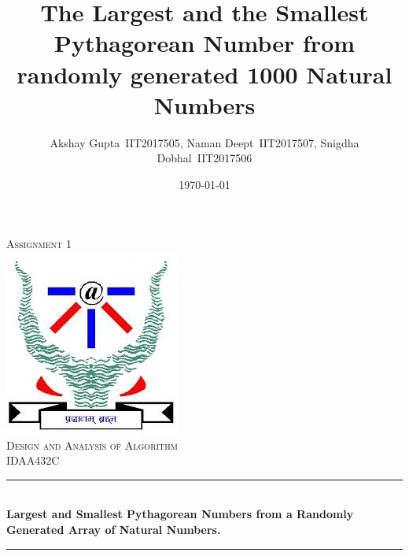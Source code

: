 \documentclass[twocolumn]{article}      %
\title{The Largest and the Smallest Pythagorean Number from randomly generated 1000 Natural Numbers}  %
\author{Akshay Gupta~{IIT2017505}, \hspace{6pt}Naman Deept~{IIT2017507},  \hspace{6pt}Snigdha Dobhal~{IIT2017506}
 }
\date{\today}      %
\begin{document}
\begin{titlepage}

\newcommand{\HRule}{\rule{\linewidth}{0.5mm}} %

\center %
 

\textsc{\LARGE Assignment 1}\\[1.5cm] %
\includegraphics[scale=0.7]{iiitlogo.jpg}\\[1cm] %
\textsc{\Large Design and Analysis of Algorithm}\\[0.5cm] %
\textsc{\large IDAA432C}\\[0.5cm] %


\HRule \\[0.4cm]
{ \large \bfseries Largest and Smallest Pythagorean Numbers from a Randomly Generated Array of Natural Numbers. }\\[0.4cm] %
\HRule \\[1.5cm]
 


\end{titlepage}
\end{document}
